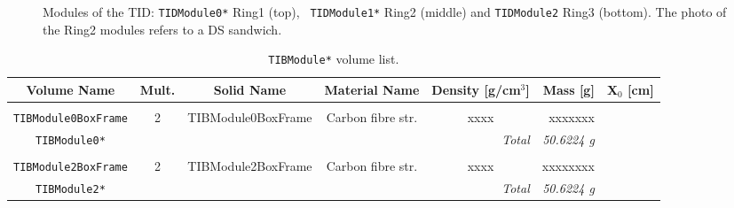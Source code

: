 \documentclass{cmspaper}
\begin{document}
\begin{figure}[p]
\begin{center}
    \caption{Modules of the TID: {\tt TIDModule0*} Ring1 (top), {\tt
    TIDModule1*} Ring2 (middle) and {\tt TIDModule2} Ring3
    (bottom). The photo of the Ring2 modules refers to a DS
    sandwich.} 
    \label{fig:TIDModule}
  \end{center}
\end{figure}

\pagebreak
\begin{table}
  \caption{{\tt TIBModule*} volume list.}
  \label{tab:tib_module}
  \begin{center}
    \begin{tabular}{cccccrr}
         Volume Name                   & Mult. & Solid Name                    & Material Name         & Density [g/cm$^3$]    & Mass [g] & X$_0$ [cm]     \\ 
	 \hline \\
         {\tt TIBModule0BoxFrame}     & 2     & TIBModule0BoxFrame            & Carbon fibre str.     & xxxx          & xxxxxxx   &   \\
	 {\tt TIBModule0*}             &  \multicolumn{4}{r}{\em Total } & {\em  50.6224 g} & \\
	 \hline  \\
         {\tt TIBModule2BoxFrame}     & 2     & TIBModule2BoxFrame            & Carbon fibre str.     & xxxx          & xxxxxxxx  &   \\
	 {\tt TIBModule2*}             &  \multicolumn{4}{r}{\em Total } & {\em  50.6224 g} & \\
	 \hline
    \end{tabular}
  \end{center}
\end{table}
\end{document}
